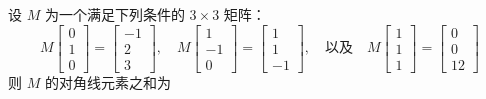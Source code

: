 \begin{questions}
\question 设 $M$ 为一个满足下列条件的 $3\times3$ 矩阵：
\[
M \begin{bmatrix} 0 \\ 1 \\ 0 \end{bmatrix} = \begin{bmatrix} -1 \\ 2 \\ 3 \end{bmatrix}, \quad M \begin{bmatrix} 1 \\ -1 \\ 0 \end{bmatrix} = \begin{bmatrix} 1 \\ 1 \\ -1 \end{bmatrix}, \quad \text{以及} \quad M \begin{bmatrix} 1 \\ 1 \\ 1 \end{bmatrix} = \begin{bmatrix} 0 \\ 0 \\ 12 \end{bmatrix}
\]
则 $M$ 的对角线元素之和为


\end{questions}
